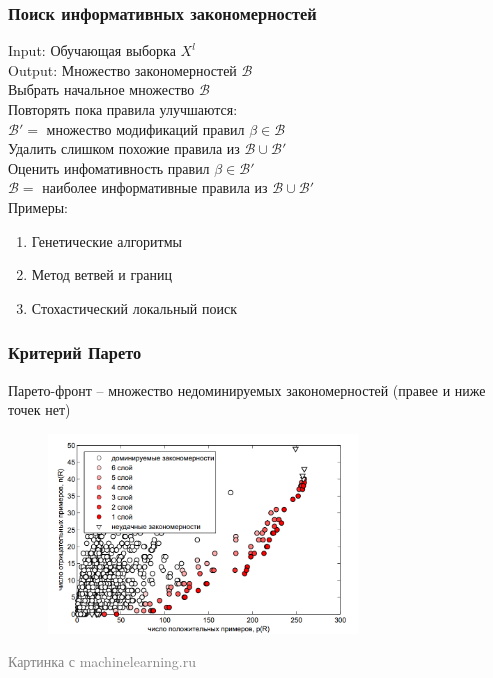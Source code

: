 \documentclass[12pt]{beamer}
\begin{document}



\begin{frame}\frametitle{Поиск информативных закономерностей}
Input: Обучающая выборка $X^l$\\
Output: Множество закономерностей $\mathcal{B}$\\
\vspace{5mm}
Выбрать начальное множество $\mathcal{B}$\\
Повторять пока правила улучшаются:\\
\hspace{10mm} $\mathcal{B}'=$ множество модификаций правил $\beta \in \mathcal{B}$\\
\hspace{10mm} Удалить слишком похожие правила из $\mathcal{B} \cup \mathcal{B}'$\\
\hspace{10mm} Оценить инфомативность правил $\beta \in \mathcal{B}'$\\
\hspace{10mm} $\mathcal{B}=$ наиболее информативные правила из $\mathcal{B} \cup \mathcal{B}'$\\
\vspace{5mm}
Примеры:\\
\begin{enumerate}[--]
	\item Генетические алгоритмы
	\item Метод ветвей и границ	
	\item Стохастический локальный поиск	
\end{enumerate}

\end{frame}

\begin{frame}\frametitle{Критерий Парето}
Парето-фронт -- множество недоминируемых закономерностей (правее и ниже точек нет)
\begin{figure}[htbp]
  \includegraphics[height=150pt, keepaspectratio = true]{images/pareto}   
\end{figure}
\footnotesize\textcolor{gray} {Картинка с machinelearning.ru}
\end{frame}
\end{document}
